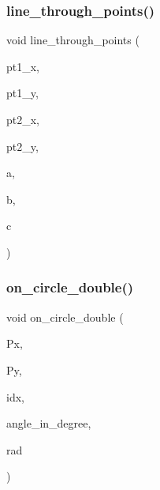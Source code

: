 \mbox{\label{draw_8_c_a5ee4019c0d4a044589e3789747e09ab1}} 
\subsubsection{\texorpdfstring{line\+\_\+through\+\_\+points()}{line\_through\_points()}}
{\footnotesize\ttfamily void line\+\_\+through\+\_\+points (\begin{DoxyParamCaption}\item[{double}]{pt1\+\_\+x,  }\item[{double}]{pt1\+\_\+y,  }\item[{double}]{pt2\+\_\+x,  }\item[{double}]{pt2\+\_\+y,  }\item[{double \&}]{a,  }\item[{double \&}]{b,  }\item[{double \&}]{c }\end{DoxyParamCaption})}

\mbox{\label{draw_8_c_a77c6449b834be197cdf194bcf7d0a0fc}} 
\subsubsection{\texorpdfstring{on\+\_\+circle\+\_\+double()}{on\_circle\_double()}}
{\footnotesize\ttfamily void on\+\_\+circle\+\_\+double (\begin{DoxyParamCaption}\item[{double $\ast$}]{Px,  }\item[{double $\ast$}]{Py,  }\item[{\mbox{\hyperlink{galois_8h_a09fddde158a3a20bd2dcadb609de11dc}{I\+NT}}}]{idx,  }\item[{double}]{angle\+\_\+in\+\_\+degree,  }\item[{double}]{rad }\end{DoxyParamCaption})}

\mbox{\label{draw_8_c_a4c1cb8659cfd62a9742b3d12c6f5397f}} 
